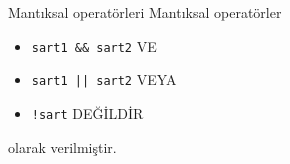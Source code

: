 \begin{frame}[fragile]{Mantıksal operatörleri}
    Mantıksal operatörler
    \begin{itemize}
        \item \lstinline{sart1 && sart2} VE
        \item \lstinline{sart1 || sart2} VEYA 
        \item \lstinline{!sart} DEĞİLDİR 
    \end{itemize}
    olarak verilmiştir.
\end{frame}
